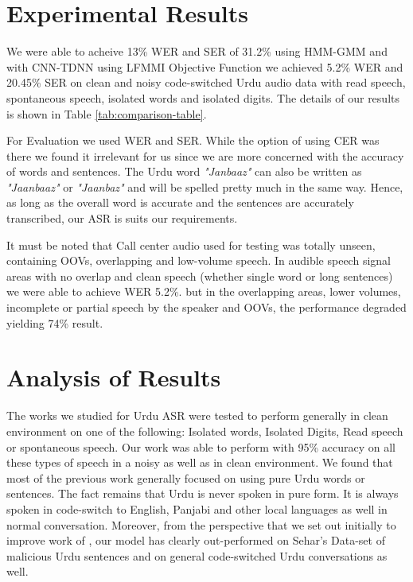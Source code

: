 \documentclass[lettersize,journal]{IEEEtran}
\begin{document}
\section{Experimental Results}
\label{sec:experimental-results}
We were able to acheive 13\% WER and SER of 31.2\% using HMM-GMM and with CNN-TDNN using LFMMI Objective Function we achieved 5.2\% WER and 20.45\% SER on clean and noisy code-switched Urdu audio data with read speech, spontaneous speech, isolated words and isolated digits. The details of our results is shown in Table \ref{tab:comparison-table}. 

For Evaluation we used WER and SER. While the option of using CER was there we found it irrelevant for us since we are more concerned with the accuracy of words and sentences. The Urdu word \textit{"Janbaaz"} can also be written as \textit{"Jaanbaaz"} or \textit{"Jaanbaz"} and will be spelled pretty much in the same way. Hence, as long as the overall word is accurate and the sentences are accurately transcribed, our ASR is suits our requirements.

It must be noted that Call center audio used for testing was totally unseen, containing OOVs, overlapping and low-volume speech. In audible speech signal areas with no overlap and clean speech (whether single word or long sentences) we were able to achieve WER 5.2\%. but in the overlapping areas, lower volumes, incomplete or partial speech by the speaker and OOVs, the performance degraded yielding 74\% result. 

\section{Analysis of Results}
\label{se:discussion}

The works we studied for Urdu ASR were tested to perform generally in clean environment on one of the following: Isolated words, Isolated Digits, Read speech or spontaneous speech. Our work was able to perform with 95\% accuracy on all these types of speech in a noisy as well as in clean environment. We found that most of the previous work generally focused on using pure Urdu words or sentences. The fact remains that Urdu is never spoken in pure form. It is always spoken in code-switch to English, Panjabi and other local languages as well in normal conversation. Moreover, from the perspective that we set out initially to improve work of \cite{sehar_gul_detecting_2020}, our model has clearly out-performed on Sehar's Data-set of malicious Urdu sentences and on general code-switched Urdu conversations as well. 
\end{document}

